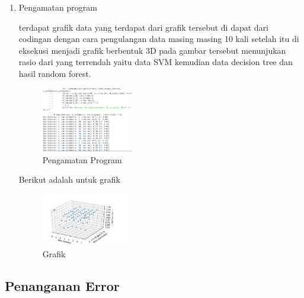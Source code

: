 \begin{enumerate}
        \item Pengamatan program \hfill \break 
        
        terdapat grafik data yang terdapat dari grafik tersebut di dapat dari codingan dengan cara pengulangan data masing masing 10 kali setelah itu di eksekusi menjadi grafik berbentuk 3D pada gambar tersebut menunjukan rasio dari yang terrendah yaitu data SVM kemudian data decision tree dan hasil random forest.
        \begin{figure}[H]
            \includegraphics[width=4cm]{figures/1174086/chapter4/8.png}
            \centering
            \caption{Pengamatan Program}
        \end{figure}

        Berikut adalah untuk grafik \hfill \break 
        \begin{figure}[H]
            \includegraphics[width=4cm]{figures/1174086/chapter4/9.png}
            \centering
            \caption{Grafik}
        \end{figure}
    \end{enumerate}
    \subsection{Penanganan Error}
